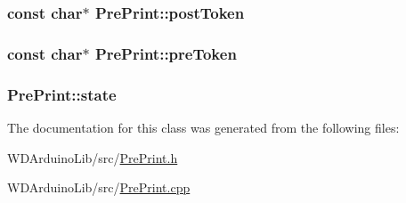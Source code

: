 \subsubsection[{post\+Token}]{\setlength{\rightskip}{0pt plus 5cm}const char$\ast$ Pre\+Print\+::post\+Token\hspace{0.3cm}{\ttfamily [protected]}}\label{class_pre_print_a8c087522317c48cb74a26c5ac4220cc3}
\hypertarget{class_pre_print_a6d490d820f913d07f7b27c3d9f7641f4}{}
\subsubsection[{pre\+Token}]{\setlength{\rightskip}{0pt plus 5cm}const char$\ast$ Pre\+Print\+::pre\+Token\hspace{0.3cm}{\ttfamily [protected]}}\label{class_pre_print_a6d490d820f913d07f7b27c3d9f7641f4}
\hypertarget{class_pre_print_a3d55c492a2085b880305ebf9e09faa31}{}
\subsubsection[{state}]{ Pre\+Print\+::state\hspace{0.3cm}{\ttfamily [protected]}}\label{class_pre_print_a3d55c492a2085b880305ebf9e09faa31}


The documentation for this class was generated from the following files\+:\begin{DoxyCompactItemize}
\item 
W\+D\+Arduino\+Lib/src/\hyperlink{_pre_print_8h}{Pre\+Print.\+h}\item 
W\+D\+Arduino\+Lib/src/\hyperlink{_pre_print_8cpp}{Pre\+Print.\+cpp}\end{DoxyCompactItemize}
